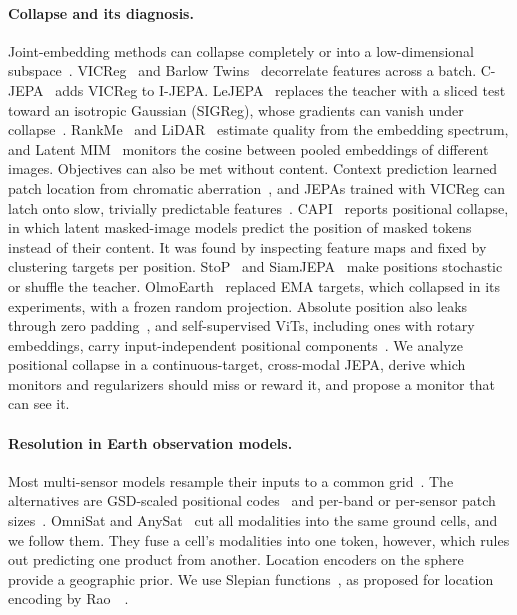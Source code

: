 \paragraph{Collapse and its diagnosis.} Joint-embedding methods can collapse completely or into a low-dimensional subspace~\cite{jing2022understanding,hua2021feature,tian2021understanding}. VICReg~\cite{bardes2022vicreg} and Barlow Twins~\cite{zbontar2021barlow} decorrelate features across a batch. C-JEPA~\cite{mo2024connecting} adds VICReg to I-JEPA. LeJEPA~\cite{balestriero2025lejepa} replaces the teacher with a sliced test toward an isotropic Gaussian (SIGReg), whose gradients can vanish under collapse~\cite{wu2026visreg}. RankMe~\cite{garrido2023rankme} and LiDAR~\cite{thilak2024lidar} estimate quality from the embedding spectrum, and Latent MIM~\cite{wei2024towards} monitors the cosine between pooled embeddings of different images. Objectives can also be met without content. Context prediction learned patch location from chromatic aberration~\cite{doersch2015unsupervised}, and JEPAs trained with VICReg can latch onto slow, trivially predictable features~\cite{sobal2022joint}. CAPI~\cite{darcet2025cluster} reports positional collapse, in which latent masked-image models predict the position of masked tokens instead of their content. It was found by inspecting feature maps and fixed by clustering targets per position. StoP~\cite{bar2024stochastic} and SiamJEPA~\cite{yamada2026siamjepa} make positions stochastic or shuffle the teacher. OlmoEarth~\cite{herzog2026olmoearth} replaced EMA targets, which collapsed in its experiments, with a frozen random projection. Absolute position also leaks through zero padding~\cite{islam2020much,kayhan2020translation,chu2023conditional}, and self-supervised ViTs, including ones with rotary embeddings, carry input-independent positional components~\cite{pawlowsky2026dino,yang2024denoising}. We analyze positional collapse in a continuous-target, cross-modal JEPA, derive which monitors and regularizers should miss or reward it, and propose a monitor that can see it.

\paragraph{Resolution in Earth observation models.} Most multi-sensor models resample their inputs to a common grid~\cite{fuller2023croma,xiong2024neural,jakubik2025terramind,tseng2025galileo}. The alternatives are GSD-scaled positional codes~\cite{reed2023scale,irvin2023usat,forgaard2026thor} and per-band or per-sensor patch sizes~\cite{irvin2023usat,wang2025towards}. OmniSat and AnySat~\cite{astruc2024omnisat,astruc2025anysat} cut all modalities into the same ground cells, and we follow them. They fuse a cell's modalities into one token, however, which rules out predicting one product from another. Location encoders on the sphere~\cite{mai2020multi,klemmer2025satclip,vivancocepeda2023geoclip,russwurm2024geographic} provide a geographic prior. We use Slepian functions~\cite{simons2006spatiospectral}, as proposed for location encoding by Rao~\etal~\cite{rao2026localized}.

